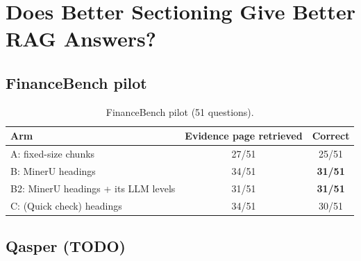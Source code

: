 \section{Does Better Sectioning Give Better RAG Answers?}
\label{sec:rag}
\subsection{FinanceBench pilot}\label{sec:financebench}
\begin{table}[t]\centering
  \caption{FinanceBench pilot (51 questions).}\label{tab:rag}
  \begin{tabular}{lcc}\toprule
  Arm & Evidence page retrieved & Correct \\\midrule
  A: fixed-size chunks & 27/51 & 25/51 \\
  B: MinerU headings & 34/51 & \textbf{31/51} \\
  B2: MinerU headings + its LLM levels & 31/51 & \textbf{31/51} \\
  C: \sysname{} (Quick check) headings & 34/51 & 30/51 \\\bottomrule
  \end{tabular}
\end{table}
\subsection{Qasper (TODO)}\label{sec:qasper}
